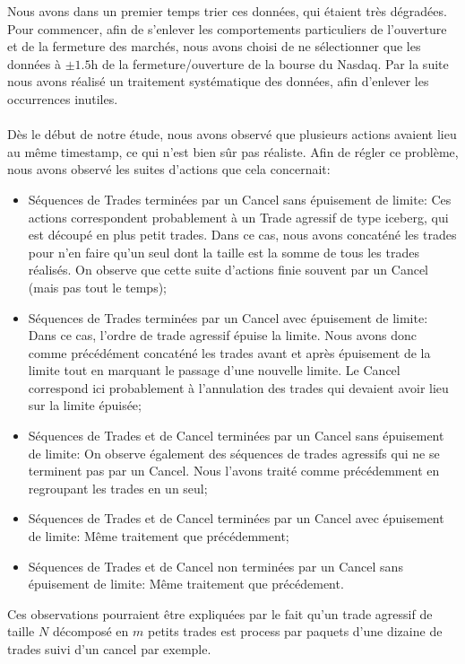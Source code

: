 \documentclass[12pt,a4paper]{article}
\theoremstyle{definition}
\theoremstyle{remark}
\begin{document}
Nous avons dans un premier temps trier ces données, qui étaient très dégradées. Pour commencer, afin de s'enlever les comportements particuliers de l'ouverture et de la fermeture des marchés, nous avons choisi de ne sélectionner que les données à $\pm1.5$h de la fermeture/ouverture de la bourse du Nasdaq. Par la suite nous avons réalisé un traitement systématique des données, afin d'enlever les occurrences inutiles.
\\
\\
Dès le début de notre étude, nous avons observé que plusieurs actions avaient lieu au même timestamp, ce qui n'est bien sûr pas réaliste. Afin de régler ce problème, nous avons observé les suites d'actions que cela concernait:
\begin{itemize}
\item Séquences de Trades terminées par un Cancel sans épuisement de limite: Ces actions correspondent probablement à un Trade agressif de type iceberg, qui est découpé en plus petit trades. Dans ce cas, nous avons concaténé les trades pour n'en faire qu'un seul dont la taille est la somme de tous les trades réalisés. On observe que cette suite d'actions finie souvent par un Cancel (mais pas tout le temps);
\item Séquences de Trades terminées par un Cancel avec épuisement de limite: Dans ce cas, l'ordre de trade agressif épuise la limite. Nous avons donc comme précédément concaténé les trades avant et après épuisement de la limite tout en marquant le passage d'une nouvelle limite. Le Cancel correspond ici probablement à l'annulation des trades qui devaient avoir lieu sur la limite épuisée;
\item Séquences de Trades et de Cancel terminées par un Cancel sans épuisement de limite: On observe également des séquences de trades agressifs qui ne se terminent pas par un Cancel. Nous l'avons traité comme précédemment en regroupant les trades en un seul;
\item Séquences de Trades et de Cancel terminées par un Cancel avec épuisement de limite: Même traitement que précédemment;
\item Séquences de Trades et de Cancel non terminées par un Cancel sans épuisement de limite: Même traitement que précédement.
\end{itemize}
Ces observations pourraient être expliquées par le fait qu'un trade agressif de taille $N$ décomposé en $m$ petits trades est process par paquets d'une dizaine de trades suivi d'un cancel par exemple.
\\
\\
\end{document}
